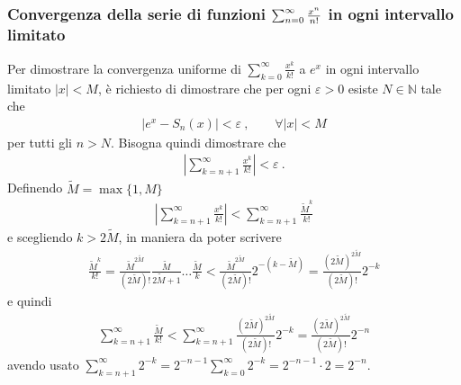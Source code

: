 \documentclass[letterpaper,10pt,italian]{jupyterBook}
\begin{document}
\subsubsection{Convergenza della serie di funzioni \protect\(\sum_{n=0}^{\infty} \frac{x^n}{n!}\protect\) in ogni intervallo limitato}
\label{\detokenize{ch/precalculus/exponential_logarithm-notes:convergenza-della-serie-di-funzioni-sum-n-0-infty-frac-x-n-n-in-ogni-intervallo-limitato}}\label{\detokenize{ch/precalculus/exponential_logarithm-notes:math-hs-exp-log-notes-convergence}}
\sphinxAtStartPar
Per dimostrare la convergenza uniforme di \(\sum_{k=0}^{\infty} \frac{x^k}{k!}\) a \(e^x\) in ogni intervallo limitato \(|x| < M\), è richiesto di dimostrare che per ogni \(\varepsilon > 0\) esiste \(N \in \mathbb{N}\) tale che
\begin{equation*}
\begin{split}|e^x - S_n(x)| < \varepsilon \ , \qquad \forall |x| < M \end{split}
\end{equation*}
\sphinxAtStartPar
per tutti gli \(n > N\). Bisogna quindi dimostrare che
\begin{equation*}
\begin{split}\left| \sum_{k=n+1}^{\infty} \frac{x^k}{k!} \right| < \varepsilon \ .\end{split}
\end{equation*}
\sphinxAtStartPar
Definendo \(\tilde{M} = \max\{ 1, M \}\)
\begin{equation*}
\begin{split}\left| \sum_{k=n+1}^{\infty} \frac{x^k}{k!} \right| < \sum_{k=n+1}^{\infty} \frac{\tilde{M}^k}{k!}\end{split}
\end{equation*}
\sphinxAtStartPar
e scegliendo \(k > 2 \tilde{M}\), in maniera da poter scrivere
\begin{equation*}
\begin{split}\frac{\tilde{M}^k}{k!} = \frac{\tilde{M}^{2 \tilde{M}}}{( 2 \tilde{M})!} \frac{\tilde{M}}{2\tilde{M}+1} \dots \frac{\tilde{M}}{k} <  \frac{\tilde{M}^{2 \tilde{M}}}{( 2 \tilde{M})!} 2^{-(k - \tilde{M})} = \frac{(2 \tilde{M})^{2 \tilde{M}}}{(2 \tilde{M})!} 2^{-k}\end{split}
\end{equation*}
\sphinxAtStartPar
e quindi
\begin{equation*}
\begin{split}\sum_{k=n+1}^{\infty} \frac{\tilde{M}}{k!} < \sum_{k=n+1}^{\infty} \frac{(2 \tilde{M})^{2 \tilde{M}}}{(2\tilde{M})!} 2^{-k} =  \frac{(2 \tilde{M})^{2 \tilde{M}}}{(2\tilde{M})!} 2^{-n}\end{split}
\end{equation*}
\sphinxAtStartPar
avendo usato \(\sum_{k=n+1}^{\infty} 2^{-k} = 2^{-n-1} \sum_{k=0}^{\infty} 2^{-k} = 2^{-n-1} \cdot 2 = 2^{-n}\).
\end{document}
